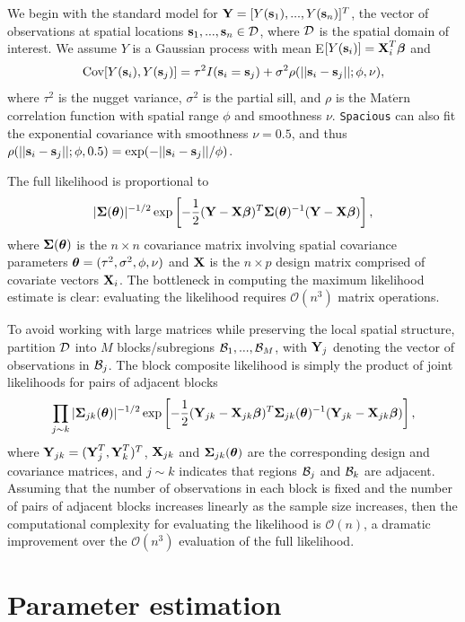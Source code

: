 \documentclass[11pt]{article}
\newcommand{\btheta}{ \mbox{\boldmath $\theta$}}
\newcommand{\bbeta}{ \mbox{\boldmath $\beta$}}
\newcommand{\bSigma}{ \mbox{\boldmath $\Sigma$}}
\newcommand{\bX}{ \mbox{\bf X}}
\newcommand{\bY}{ \mbox{\bf Y}}
\newcommand{\bs}{ \mbox{\bf s}}
\newcommand{\calD}{{\cal D}}
\newcommand{\calB}{{\cal B}}
\newcommand{\Matern}{ \mbox{Mat$\acute{\mbox{e}}$rn}}
\begin{document}
We begin with the standard model for $\bY = [Y(\bs_1),...,Y(\bs_n)]^T$, the vector of observations at spatial locations $\bs_1,...,\bs_n\in \calD$, where $\calD$ is the spatial domain of interest.
We assume $Y$ is a Gaussian process with mean E$[Y(\bs_i)]=\bX_i^T\bbeta$ and $$\mbox{Cov}[Y(\bs_i),Y(\bs_j)]=\tau^2I(\bs_i=\bs_j) +\sigma^2\rho(||\bs_i-\bs_j||;\phi,\nu),$$
where $\tau^2$ is the nugget variance, $\sigma^2$ is the partial sill, and $\rho$ is the $\Matern$ correlation function with spatial range $\phi$ and smoothness $\nu$.
{\tt Spacious} can also fit the exponential covariance with smoothness $\nu=0.5$, and thus $\rho(||\bs_i-\bs_j||;\phi,0.5) = \exp(-||\bs_i-\bs_j||/\phi)$.

The full likelihood is proportional to
$$ |\bSigma(\btheta)|^{-1/2}\exp\left[-\frac{1}{2}(\bY-\bX\bbeta)^T\bSigma(\btheta)^{-1}(\bY-\bX\bbeta)\right],$$
where $\bSigma(\btheta)$ is the $n\times n$ covariance matrix involving spatial covariance parameters $\btheta = (\tau^2,\sigma^2,\phi,\nu)$ and $\bX$ is the $n\times p$ design matrix comprised of covariate vectors $\bX_i$.
The bottleneck in computing the maximum likelihood estimate is clear: evaluating the likelihood requires $\mathcal{O}(n^3)$ matrix operations.

To avoid working with large matrices while preserving the local spatial structure, \cite{Eidsvik:2013} partition $\calD$ into $M$ blocks/subregions $\calB_1,...,\calB_M$, with $\bY_j$ denoting the vector of observations in $\calB_j$.
The block composite likelihood is simply the product of joint likelihoods for pairs of adjacent blocks
$$ \prod_{j\sim k}
    |\bSigma_{jk}(\btheta)|^{-1/2}\exp\left[-\frac{1}{2}(\bY_{jk}-\bX_{jk}\bbeta)^T\bSigma_{jk}(\btheta)^{-1}(\bY_{jk}-\bX_{jk}\bbeta)\right],$$
where $\bY_{jk} = (\bY_j^T, \bY_k^T)^T$, $\bX_{jk}$ and $\bSigma_{jk}(\btheta)$ are the corresponding design and covariance matrices, and $j\sim k$ indicates that regions $\calB_j$ and $\calB_k$ are adjacent.
Assuming that the number of observations in each block is fixed and the number of pairs of adjacent blocks increases linearly as the sample size increases, then the computational complexity for evaluating the likelihood is $\mathcal{O}(n)$, a dramatic improvement over the $\mathcal{O}(n^3)$ evaluation of the full likelihood.

\section{Parameter estimation}\label{s:estimate}
\end{document}
